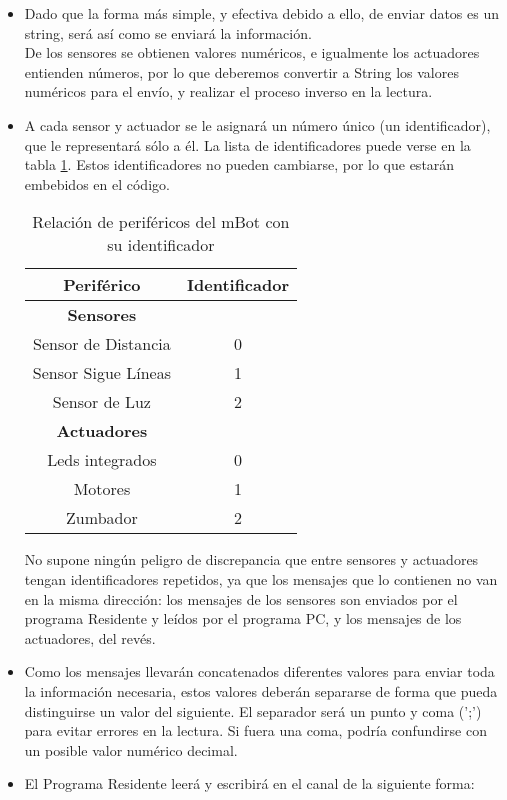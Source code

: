 \begin{itemize}		
	\item Dado que la forma más simple, y efectiva debido a ello, de enviar datos es un string, será así como se enviará la información. \\
	De los sensores se obtienen valores numéricos, e igualmente los actuadores entienden números, por lo que deberemos convertir a String los valores numéricos para el envío, y realizar el proceso inverso en la lectura.
	\item A cada sensor y actuador se le asignará un número único (un identificador), que le representará sólo a él. La lista de identificadores puede verse en la tabla \ref{table:identificadoresperifericos}. Estos identificadores no pueden cambiarse, por lo que estarán embebidos en el código.
	\begin{table}[h]
		\centering
		\begin{tabular}{ c | c }
			\textbf{Periférico} & \textbf{Identificador} \\
			\hline	
			\textbf{Sensores} & \\
			\hline		
			Sensor de Distancia &  0\\
			Sensor Sigue Líneas & 1 \\
			Sensor de Luz & 2\\
			\hline
			\textbf{Actuadores} & \\
			\hline	
			Leds integrados & 0\\
			Motores & 1\\
			Zumbador & 2 \\				
		\end{tabular}
		\caption{Relación de periféricos del mBot con su identificador}
		\label{table:identificadoresperifericos}
		\end{table} 
	No supone ningún peligro de discrepancia que entre sensores y actuadores tengan identificadores repetidos, ya que los mensajes que lo contienen no van en la misma dirección: los mensajes de los sensores son enviados por el programa Residente y leídos por el programa PC, y los mensajes de los actuadores, del revés.
	\item Como los mensajes llevarán concatenados diferentes valores para enviar toda la información necesaria, estos valores deberán separarse de forma que pueda distinguirse un valor del siguiente. El separador será un punto y coma (';') para evitar errores en la lectura. Si fuera una coma, podría confundirse con un posible valor numérico decimal.
	\item El Programa Residente leerá y escribirá en el canal de la siguiente forma:

\end{itemize}
